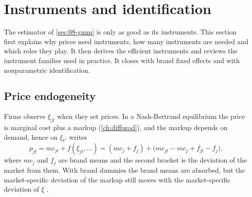 \section{Instruments and identification}\label{sec:08-instruments}

The estimator of \cref{sec:08-gmm} is only as good as its instruments. This section first explains why prices
need instruments, how many instruments are needed and which roles they play. It then derives the efficient
instruments and reviews the instrument families used in practice. It closes with brand fixed effects and with
nonparametric identification.

\subsection{Price endogeneity}\label{sec:08-endogeneity}

Firms observe $\xi_{jt}$ when they set prices. In a Nash-Bertrand equilibrium the price is marginal cost
plus a markup (\cref{ch:diffprod}), and the markup depends on demand, hence on $\xi_t$. \citet[eq.~8]%
{Nevo2001} writes
\begin{equation*}
  p_{jt} = mc_{jt} + f(\xi_{jt}, \dots) = (mc_j + f_j) + \big(mc_{jt} - mc_j + f_{jt} - f_j\big),
\end{equation*}
where $mc_j$ and $f_j$ are brand means and the second bracket is the deviation of the market from them. With
brand dummies the brand means are absorbed, but the market-specific deviation of the markup still moves with
the market-specific deviation of $\xi$ \citep[p.~320]{Nevo2001}.

